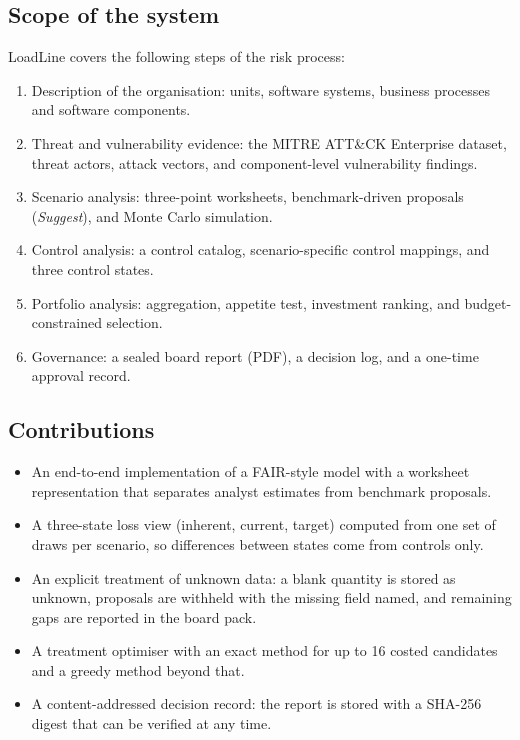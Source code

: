 \documentclass[11pt,a4paper]{article}
\begin{document}
\subsection{Scope of the system}
LoadLine covers the following steps of the risk process:
\begin{enumerate}
  \item Description of the organisation: units, software systems, business processes and software components.
  \item Threat and vulnerability evidence: the MITRE ATT\&CK Enterprise dataset, threat actors, attack vectors, and component-level vulnerability findings.
  \item Scenario analysis: three-point worksheets, benchmark-driven proposals (\emph{Suggest}), and Monte Carlo simulation.
  \item Control analysis: a control catalog, scenario-specific control mappings, and three control states.
  \item Portfolio analysis: aggregation, appetite test, investment ranking, and budget-constrained selection.
  \item Governance: a sealed board report (PDF), a decision log, and a one-time approval record.
\end{enumerate}

\subsection{Contributions}
\begin{itemize}
  \item An end-to-end implementation of a FAIR-style model with a worksheet representation that separates analyst estimates from benchmark proposals.
  \item A three-state loss view (inherent, current, target) computed from one set of draws per scenario, so differences between states come from controls only.
  \item An explicit treatment of unknown data: a blank quantity is stored as unknown, proposals are withheld with the missing field named, and remaining gaps are reported in the board pack.
  \item A treatment optimiser with an exact method for up to 16 costed candidates and a greedy method beyond that.
  \item A content-addressed decision record: the report is stored with a SHA-256 digest that can be verified at any time.
\end{itemize}
\end{document}
